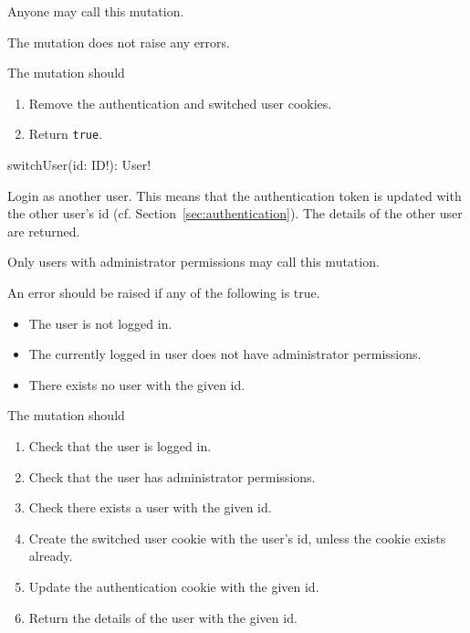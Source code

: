 \restrictions

Anyone may call this mutation.

\errors
The mutation does not raise any errors.

\functionality

The mutation should

\begin{enumerate}
    \item Remove the authentication and switched user cookies.
    \item Return \verb|true|.
\end{enumerate}


\begin{code}
switchUser(id: ID!): User!
\end{code}

Login as another user. This means that the authentication token is updated with the other user's id (cf. Section~\ref{sec:authentication}). The details of the other user are returned.

\restrictions

Only users with administrator permissions may call this mutation.

\errors

An error should be raised if any of the following is true.

\begin{itemize}
    \item The user is not logged in.
    \item The currently logged in user does not have administrator permissions.
    \item There exists no user with the given id.
\end{itemize}

\functionality

The mutation should

\begin{enumerate}
    \item Check that the user is logged in.
    \item Check that the user has administrator permissions.
    \item Check there exists a user with the given id.
    \item Create the switched user cookie with the user's id, unless the cookie exists already.
    \item Update the authentication cookie with the given id.
    \item Return the details of the user with the given id.
\end{enumerate}

